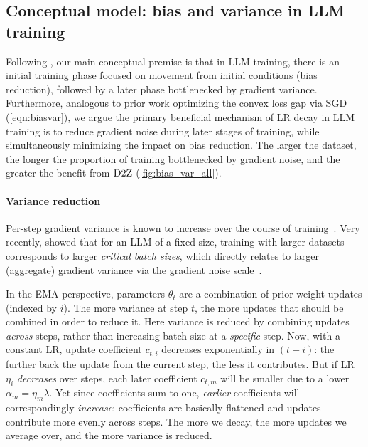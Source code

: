 \subsection{Conceptual model: bias and variance in LLM training}\label{subsec:biasvar}



Following \citet{andriushchenko2023why}, our main conceptual premise
is that in LLM training, there is an initial training phase focused on
movement from initial conditions (bias reduction), followed by a later
phase bottlenecked by gradient variance.
%
Furthermore, analogous to prior work optimizing the convex loss gap
via SGD (\cref{eqn:biasvar}), we argue the primary beneficial
mechanism of LR decay in LLM training is to reduce gradient noise
during later stages of training, while simultaneously minimizing the
impact on bias reduction.
%
The larger the dataset, the longer the proportion of training
bottlenecked by gradient noise, and the greater the benefit from $\mbox{D2Z}$
(\cref{fig:bias_var_all}).

\paragraph{Variance reduction}

Per-step gradient variance is known to increase over the course of
training~\citep{mccandlish2018empirical}.
%
Very recently, \citet{zhang2024how} showed that for an LLM of a fixed
size, training with larger datasets corresponds to larger
\emph{critical batch sizes}, which directly relates to larger
(aggregate) gradient variance via the gradient noise
scale~\citep{mccandlish2018empirical}.



In the EMA perspective, parameters $\theta_t$ are a combination of
prior weight updates (indexed by $i$).  The more variance at step $t$,
the more updates that should be combined in order to reduce it.
%
Here variance is reduced by combining updates \emph{across} steps,
rather than increasing batch size at a \emph{specific} step.
%
Now, with a constant LR, update coefficient $c_{t, i}$ decreases
exponentially in $(t - i)$: the further back the update from the
current step, the less it contributes.
%
But if LR $\eta_i$ \emph{decreases} over steps, each later coefficient
$c_{t, m}$ will be smaller due to a lower $\alpha_m = \eta_m\lambda$.
Yet since coefficients sum to one, \emph{earlier} coefficients will
correspondingly \emph{increase}: coefficients are basically flattened
and updates contribute more evenly across steps.
%
%
The more we decay, the more updates we average over, and the more
variance is reduced.
%

